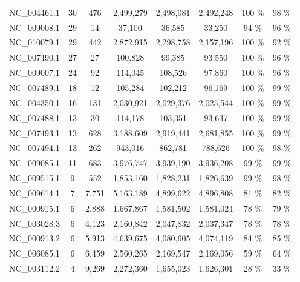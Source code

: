 \documentclass{pnastwo}
\begin{document}
\begin{table}
\begin{tabular}{@{\extracolsep{\fill}}l c c c c c c c}
NC\_004461.1 & 30
& 476 & 2,499,279 & 2,498,081 & 2,492,248 & 100 \% & 98 \% \\
NC\_009008.1 &
29 & 14 & 37,100 & 36,585 & 33,250 & 94 \% & 96 \% \\
NC\_010079.1 &
29 & 442 & 2,872,915 & 2,298,758 & 2,157,196 & 100 \% & 92 \% \\
NC\_007490.1 & 27
& 27 & 100,828 & 99,385 & 93,550 & 100 \% & 96 \% \\
NC\_009007.1 &
24 & 92 & 114,045 & 108,526 & 97,860 & 100 \% & 96 \% \\
NC\_007489.1 & 18
& 12 & 105,284 & 102,212 & 96,169 & 100 \% & 99 \% \\
NC\_004350.1 & 16
& 131 & 2,030,921 & 2,029,376 & 2,025,544 & 100 \% & 99 \% \\
NC\_007488.1 & 13
& 30 & 114,178 & 103,351 & 93,637 & 100 \% & 99 \% \\
NC\_007493.1 & 13
& 628 & 3,188,609 & 2,919,441 & 2,681,855 & 100 \% & 99 \% \\
NC\_007494.1 & 13
& 262 & 943,016 & 862,781 & 788,626 & 100 \% & 98 \% \\
NC\_009085.1 &
11 & 683 & 3,976,747 & 3,939,190 & 3,936,208 & 99 \% & 99 \% \\
NC\_009515.1 & 9
& 552 & 1,853,160 & 1,828,231 & 1,826,639 & 99 \% & 98 \% \\
NC\_009614.1 & 7
& 7,751 & 5,163,189 & 4,899,622 & 4,896,808 & 81 \% & 82 \% \\
NC\_000915.1 & 6
& 2,888 & 1,667,867 & 1,581,502 & 1,581,024 & 78 \% & 79 \% \\
NC\_003028.3 & 6
& 4,123 & 2,160,842 & 2,047,832 & 2,037,347 & 78 \% & 78 \% \\
NC\_000913.2 & 6
& 5,913 & 4,639,675 & 4,080,605 & 4,074,119 & 84 \% & 85 \% \\
NC\_006085.1 & 6
& 6,459 & 2,560,265 & 2,169,547 & 2,169,056 & 59 \% & 64 \% \\
NC\_003112.2 & 4
& 9,269 & 2,272,360 & 1,655,023 & 1,626,301 & 28 \% & 33 \% \\
\hline
\end{tabular}
\label{ref-summary}
\end{table}
\end{document}

